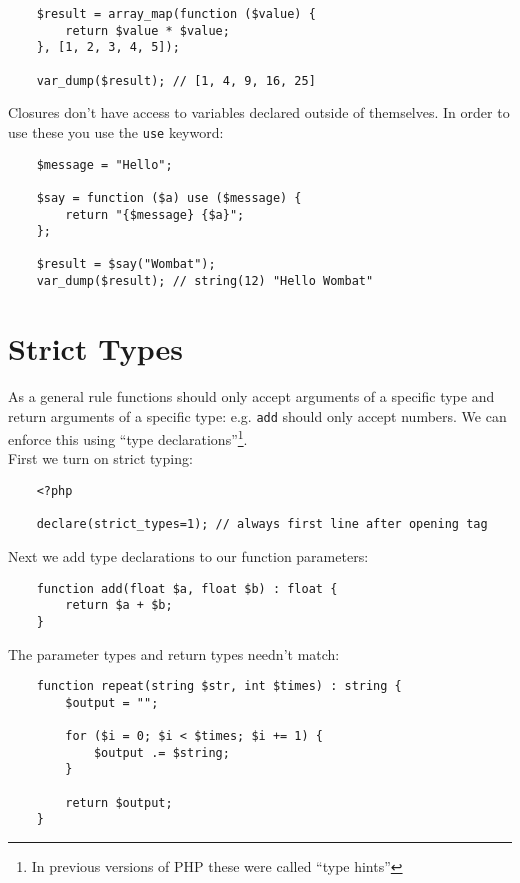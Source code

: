 \begin{verbatim}
    $result = array_map(function ($value) {
        return $value * $value;
    }, [1, 2, 3, 4, 5]);

    var_dump($result); // [1, 4, 9, 16, 25]
\end{verbatim}

Closures don't have access to variables declared outside of themselves. In order to use these you use the \texttt{use} keyword:

\begin{verbatim}
    $message = "Hello";

    $say = function ($a) use ($message) {
        return "{$message} {$a}";
    };

    $result = $say("Wombat");
    var_dump($result); // string(12) "Hello Wombat"
\end{verbatim}


\section{Strict Types}

As a general rule functions should only accept arguments of a specific type and return arguments of a specific type: e.g. \texttt{add} should only accept numbers. We can enforce this using ``type declarations''\footnote{In previous versions of PHP these were called ``type hints''}.
\\

First we turn on strict typing:

\begin{verbatim}
    <?php

    declare(strict_types=1); // always first line after opening tag
\end{verbatim}

Next we add type declarations to our function parameters:

\begin{verbatim}
    function add(float $a, float $b) : float {
        return $a + $b;
    }
\end{verbatim}

The parameter types and return types needn't match:

\begin{verbatim}
    function repeat(string $str, int $times) : string {
        $output = "";

        for ($i = 0; $i < $times; $i += 1) {
            $output .= $string;
        }

        return $output;
    }
\end{verbatim}

